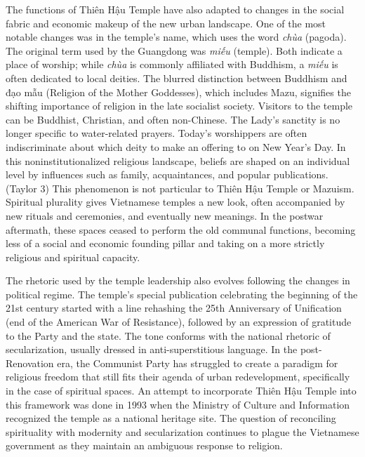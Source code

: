 The functions of Thiên Hậu Temple have also adapted to changes in the social fabric and economic makeup of the new urban landscape. One of the most notable changes was in the temple's name, which uses the word \textit{chùa} (pagoda). The original term used by the Guangdong was \textit{miếu} (temple). Both indicate a place of worship; while \textit{chùa} is commonly affiliated with Buddhism, a \textit{miếu} is often dedicated to local deities. The blurred distinction between Buddhism and đạo mẫu (Religion of the Mother Goddesses), which includes Mazu, signifies the shifting importance of religion in the late socialist society. Visitors to the temple can be Buddhist, Christian, and often non-Chinese. The Lady’s sanctity is no longer specific to water-related prayers. Today’s worshippers are often indiscriminate about which deity to make an offering to on New Year’s Day. In this noninstitutionalized religious landscape, beliefs are shaped on an individual level by influences such as family, acquaintances, and popular publications. (Taylor 3) This phenomenon is not particular to Thiên Hậu Temple or Mazuism. Spiritual plurality gives Vietnamese temples a new look, often accompanied by new rituals and ceremonies, and eventually new meanings. In the postwar aftermath, these spaces ceased to perform the old communal functions, becoming less of a social and economic founding pillar and taking on a more strictly religious and spiritual capacity. %

The rhetoric used by the temple leadership also evolves following the changes in political regime. The temple's special publication celebrating the beginning of the 21st century started with a line rehashing the 25th Anniversary of Unification (end of the American War of Resistance), followed by an expression of gratitude to the Party and the state.  The tone conforms with the national rhetoric of secularization, usually dressed in anti-superstitious language. In the post-Renovation era, the Communist Party has struggled to create a paradigm for religious freedom that still fits their agenda of urban redevelopment, specifically in the case of spiritual spaces.  An attempt to incorporate Thiên Hậu Temple into this framework was done in 1993 when the Ministry of Culture and Information recognized the temple as a national heritage site. The question of reconciling spirituality with modernity and secularization continues to plague the Vietnamese government as they maintain an ambiguous response to religion.

